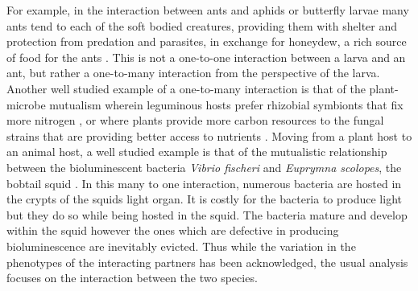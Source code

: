 \documentclass{pnastwo}
\begin{document}
\begin{article}
For example, in the interaction between ants and aphids or butterfly larvae \cite{pierce:BES:1987,hoelldobler:book:1990} many ants tend to each of the soft bodied creatures, providing them with shelter and protection from predation and parasites, in exchange for honeydew, a rich source of food for the ants \cite{hill:OEC:1989,stadler:book:2008}.
This is not a one-to-one interaction between a larva and an ant, but rather a one-to-many interaction from the perspective of the larva.
Another well studied example of a one-to-many interaction is that of the plant-microbe mutualism wherein leguminous hosts prefer rhizobial symbionts that fix more nitrogen \cite{kiers:Nature:2003}, or where plants provide more carbon resources to the fungal strains that are providing better access to nutrients \cite{kiers:Science:2011}.
Moving from a plant host to an animal host, a well studied example is that of the mutualistic relationship between the bioluminescent bacteria \textit{Vibrio fischeri} and \textit{Euprymna scolopes}, the bobtail squid \cite{mcfallngai:PLoSB:2014}.
In this many to one interaction, numerous bacteria are hosted in the crypts of the squids light organ.
It is costly for the bacteria to produce light but they do so while being hosted in the squid.
The bacteria mature and develop within the squid however the ones which are defective in producing bioluminescence are inevitably evicted.
Thus while the variation in the phenotypes of the interacting partners has been acknowledged, the usual analysis focuses on the interaction between the two species.


\end{article}
\end{document}
